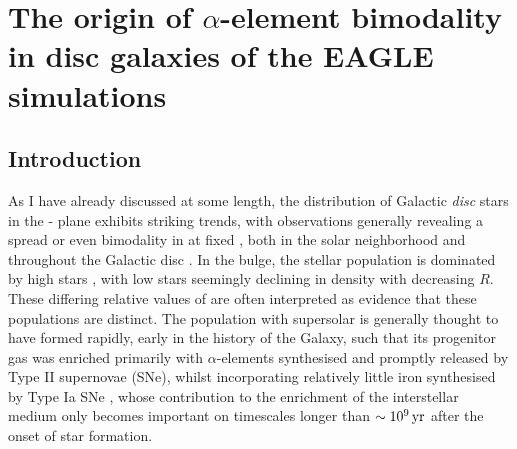 \chapter{The origin of $\alpha$-element bimodality in disc galaxies of the EAGLE simulations}
\label{chapter:eagle}
\section{Introduction}
 \label{sec:intro}

As I have already discussed at some length, the distribution of Galactic  {\it disc} stars in the \afe{}-\feh{} plane exhibits striking trends, with observations generally revealing a spread or even bimodality in \afe{} at fixed \feh{}, both in the solar neighborhood \citep[e.g.][]{1998A&A...338..161F,2003A&A...410..527B,2000A&A...358..671G,2000AJ....120.2513P,2004AJ....128.1177V,2005A&A...433..185B,2012A&A...545A..32A,2014A&A...562A..71B} and throughout the Galactic disc \citep[][]{2014A&A...564A.115A,2014ApJ...796...38N,2015ApJ...808..132H}. In the bulge, the stellar population is dominated by high \afe{} stars \citep[e.g.][]{2017arXiv170202971B}, with low \afe{} stars seemingly declining in density with decreasing $R$. These differing relative values of \afe{} are often interpreted as evidence that these populations are distinct. The population with supersolar \afe{} is generally thought to have formed rapidly, early in the history of the Galaxy, such that its progenitor gas was enriched primarily with $\alpha$-elements synthesised and promptly released by Type II supernovae (SNe), whilst incorporating relatively little iron synthesised by Type Ia SNe \citep[e.g.,][]{1989ARA&A..27..279W,1997ARA&A..35..503M}, whose contribution to the enrichment of the interstellar medium only becomes important on timescales longer than $\sim 10^9\,{\rm yr}$ after the onset of star formation.

